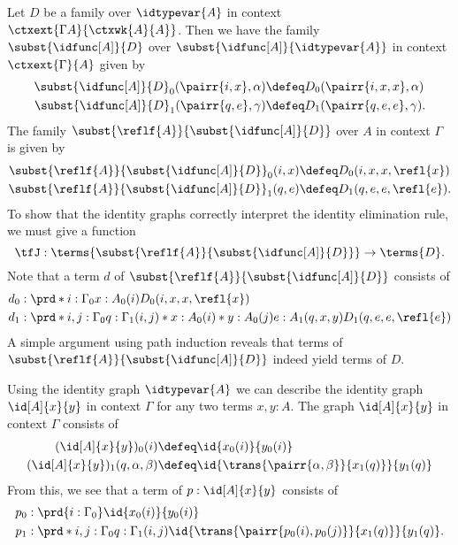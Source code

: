 \begin{defn}
Let $D$ be a family over $\idtypevar{A}$ in context 
$\ctxext{{\Gamma}{A}}{\ctxwk{A}{A}}$. Then we have the family
$\subst{\idfunc[A]}{D}$ over $\subst{\idfunc[A]}{\idtypevar{A}}$ in
context $\ctxext{\Gamma}{A}$ given by
\begin{align*}
\subst{\idfunc[A]}{D}_0(\pairr{i,x},\alpha) & \defeq D_0(\pairr{i,x,x},\alpha)\\
\subst{\idfunc[A]}{D}_1(\pairr{q,e},\gamma) & \defeq D_1(\pairr{q,e,e},\gamma).
\end{align*}
The family $\subst{\reflf{A}}{\subst{\idfunc[A]}{D}}$ over $A$ in
context $\Gamma$ is given by
\begin{align*}
\subst{\reflf{A}}{\subst{\idfunc[A]}{D}}_0(i,x) & \defeq D_0(i,x,x,\refl{x})\\
\subst{\reflf{A}}{\subst{\idfunc[A]}{D}}_1(q,e) & \defeq D_1(q,e,e,\refl{e}).
\end{align*}
To show that the identity graphs correctly interpret the identity elimination
rule, we must give a function
\begin{equation*}
\tfJ : \terms{\subst{\reflf{A}}{\subst{\idfunc[A]}{D}}}\to\terms{D}.
\end{equation*}
Note that a term $d$ of $\subst{\reflf{A}}{\subst{\idfunc[A]}{D}}$
consists of
\begin{align*}
d_0 & : \prd*{i:\Gamma_0}{x:A_0(i)}D_0(i,x,x,\refl{x})\\
d_1 & : \prd*{i,j:\Gamma_0}{q:\Gamma_1(i,j)}*{x:A_0(i)}*{y:A_0(j)}{e:A_1(q,x,y)}D_1(q,e,e,\refl{e})
\end{align*}
A simple argument using path induction reveals that terms of
$\subst{\reflf{A}}{\subst{\idfunc[A]}{D}}$ indeed yield terms of $D$. 
\end{defn}

\begin{rmk}
Using the identity graph $\idtypevar{A}$ we can describe the identity
graph $\id[A]{x}{y}$ in context $\Gamma$ for any two terms $x,y:A$. 
The graph $\id[A]{x}{y}$ in context $\Gamma$ consists of
\begin{align*}
(\id[A]{x}{y})_0(i) & \defeq \id{x_0(i)}{y_0(i)}\\
(\id[A]{x}{y})_1(q,\alpha,\beta) & \defeq \id{\trans{\pairr{\alpha,\beta}}{x_1(q)}}{y_1(q)}
\end{align*}
From this, we see that a term of $p:\id[A]{x}{y}$ consists of
\begin{align*}
p_0 & : \prd{i:\Gamma_0}\id{x_0(i)}{y_0(i)}\\
p_1 & : \prd*{i,j:\Gamma_0}{q:\Gamma_1(i,j)}\id{\trans{\pairr{p_0(i),p_0(j)}}{x_1(q)}}{y_1(q)}.
\end{align*}
\end{rmk}


